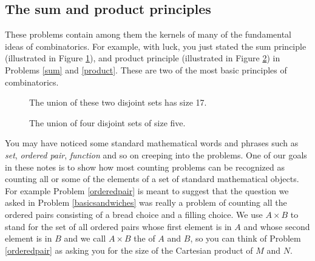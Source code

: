 \ep


\subsection{The sum and product principles} These problems
contain among them the kernels of many of the fundamental
ideas of combinatorics.   For example, with luck, you just  stated the sum principle (illustrated in Figure
\ref{sumprinc}), and product principle (illustrated in Figure
\ref{prodprinc}) in Problems
\ref{sum} and
\ref{product}.    These are two of the most basic
principles of combinatorics.  
\begin{figure}[htb]\caption{The union of these
two disjoint sets has size 17.}\label{sumprinc}\smallskip
\begin{center}\mbox{}
\end{center}  
\end{figure}
\begin{figure}[htb]\caption{The
union of four disjoint sets of size
five.}\label{prodprinc}\smallskip
\begin{center}\mbox{}
\end{center}  
\end{figure}


You may have noticed some standard mathematical words and
phrases such as {\em set}, {\em ordered pair}, {\em function}
and so on creeping into the problems.  One of our goals in
these notes is to show how most counting problems can
be recognized as counting all or some of the elements of a set
of standard mathematical objects.  For example Problem
\ref{orderedpair} is meant to suggest that the question we
asked in Problem \ref{basicsandwiches} was really a problem of
counting all the ordered pairs consisting of a bread choice
and a filling choice.  We use $A\times B$ to stand for the set
of all ordered pairs whose first element is in $A$ and whose
second element is in $B$ and we call $A\times B$ the
 of
$A$ and
$B$, so you can think of Problem
\ref{orderedpair} as asking you for the size of the Cartesian
product of
$M$ and $N$. 

